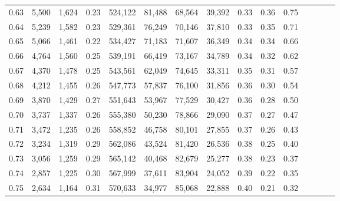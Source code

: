 \begin{tabular}{rrrcrrrrrrrrrrr}
0.63 &   5,500 &  1,624 &                                       0.23 &  524,122 &   81,488 &   68,564 &   39,392 &  0.33 &  0.36 &                         0.75 \\
0.64 &   5,239 &  1,582 &                                       0.23 &  529,361 &   76,249 &   70,146 &   37,810 &  0.33 &  0.35 &                         0.71 \\
0.65 &   5,066 &  1,461 &                                       0.22 &  534,427 &   71,183 &   71,607 &   36,349 &  0.34 &  0.34 &                         0.66 \\
0.66 &   4,764 &  1,560 &                                       0.25 &  539,191 &   66,419 &   73,167 &   34,789 &  0.34 &  0.32 &                         0.62 \\
0.67 &   4,370 &  1,478 &                                       0.25 &  543,561 &   62,049 &   74,645 &   33,311 &  0.35 &  0.31 &                         0.57 \\
0.68 &   4,212 &  1,455 &                                       0.26 &  547,773 &   57,837 &   76,100 &   31,856 &  0.36 &  0.30 &                         0.54 \\
0.69 &   3,870 &  1,429 &                                       0.27 &  551,643 &   53,967 &   77,529 &   30,427 &  0.36 &  0.28 &                         0.50 \\
0.70 &   3,737 &  1,337 &                                       0.26 &  555,380 &   50,230 &   78,866 &   29,090 &  0.37 &  0.27 &                         0.47 \\
0.71 &   3,472 &  1,235 &                                       0.26 &  558,852 &   46,758 &   80,101 &   27,855 &  0.37 &  0.26 &                         0.43 \\
0.72 &   3,234 &  1,319 &                                       0.29 &  562,086 &   43,524 &   81,420 &   26,536 &  0.38 &  0.25 &                         0.40 \\
0.73 &   3,056 &  1,259 &                                       0.29 &  565,142 &   40,468 &   82,679 &   25,277 &  0.38 &  0.23 &                         0.37 \\
0.74 &   2,857 &  1,225 &                                       0.30 &  567,999 &   37,611 &   83,904 &   24,052 &  0.39 &  0.22 &                         0.35 \\
0.75 &   2,634 &  1,164 &                                       0.31 &  570,633 &   34,977 &   85,068 &   22,888 &  0.40 &  0.21 &                         0.32 \\

\end{tabular}
